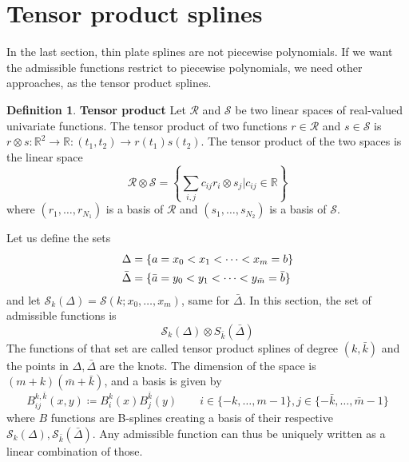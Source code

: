 \documentclass[12pt, openany]{report}
\newcommand{\R}{\mathbb{R}}
\theoremstyle{definition}
\newtheorem{definition}[thm]{Definition}
\begin{document}
\section{Tensor product splines}
In the last section, thin plate splines are not piecewise polynomials. If we want the admissible functions restrict to piecewise polynomials, we need other approaches, as the tensor product splines. \\
\begin{definition}\textbf{Tensor product}
    Let $\mathcal{R}$ and $\mathcal{S}$ be two linear spaces of real-valued univariate functions. The tensor product of two functions $r\in \mathcal{R}$ and $s\in \mathcal{S}$ is $r \otimes s:\R^2\rightarrow \R:(t_1,t_2)\rightarrow r(t_1)s(t_2)$. The tensor product of the two spaces is the linear space 
    \begin{equation}
        \mathcal{R}\otimes \mathcal{S} = \left\{ \sum_{i,j} c_{ij}r_i\otimes s_j| c_{ij}\in \R\right\}
    \end{equation}
    where $(r_1,\dots,r_{N_1})$ is a basis of $\mathcal{R}$ and $(s_1,\dots,s_{N_2})$ is a basis of $\mathcal{S}$.
\end{definition}
Let us define the sets 
\begin{align}
    \Delta &= \{a=x_0<x_1<\dots<x_m = b\}\\
    \Bar \Delta &= \{\bar a =y_0<y_1<\dots<y_{\bar m} = \bar b\}
\end{align}
and let $\mathcal{S}_k(\Delta)=\mathcal{S}(k;x_0,\dots,x_m)$, same for $\bar \Delta$. In this section, the set of admissible functions is 
\begin{equation}
    \mathcal{S}_k(\Delta)\otimes S_{\bar k}(\bar \Delta) 
\end{equation}
The functions of that set are called tensor product splines of degree $(k,\bar k)$ and the points in $\Delta, \bar \Delta$ are the knots. The dimension of the space is $(m+k)(\bar m+\bar k)$, and a basis is given by 
\begin{equation}
    B_{ij}^{k,\bar k}(x,y) \coloneqq B_i^k(x)B_j^{\bar k}(y) \qquad i\in \{-k,\dots,m-1\}, j\in \{-\bar k,\dots,\bar m-1\}
\end{equation}
where $B$ functions are B-splines creating a basis of their respective $\mathcal{S}_k(\Delta), \mathcal{S}_{\bar k}(\bar \Delta)$. Any admissible function can thus be uniquely written as a linear combination of those. 
\end{document}
